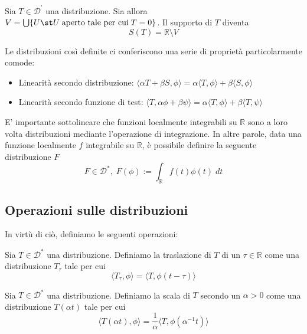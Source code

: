         \begin{definition}
            Sia $T \in \mathcal{D}^{'}$ una distribuzione.
            Sia allora $V = \bigcup \{U \st U \; \textnormal{aperto tale per cui} \; T = 0\}$.
            Il supporto di $T$ diventa
            \[
                S(T) = \mathbb{R} \setminus V
            \]
        \end{definition}

        Le distribuzioni così definite ci conferiscono una serie di proprietà particolarmente comode:

        \begin{itemize}
            \item Linearità secondo distribuzione: $\langle \alpha T + \beta S, \phi\rangle = \alpha \langle T, \phi \rangle + \beta \langle S, \phi \rangle$
            \item Linearità secondo funzione di test: $\langle T, \alpha \phi + \beta \psi \rangle = \alpha \langle T, \phi \rangle + \beta \langle T, \psi \rangle$
        \end{itemize}

        E' importante sottolineare che funzioni localmente integrabili su $\mathbb{R}$ sono a loro volta distribuzioni mediante l'operazione di integrazione.
        In altre parole, data una funzione localmente $f$ integrabile su $\mathbb{R}$, è possibile definire la seguente distribuzione $F$
        \[
            F \in \mathcal{D}^{*}, \; F(\phi) := \int_{\mathbb{R}} f(t) \phi(t) \; dt
        \]

    \subsection{Operazioni sulle distribuzioni}
        In virtù di ciò, definiamo le seguenti operazioni:

        \begin{definition}
            Sia $T \in \mathcal{D}^{*}$ una distribuzione.
            Definiamo la traslazione di $T$ di un $\tau \in \mathbb{R}$ come una distribuzione $T_{\tau}$ tale per cui
            \[
                \langle T_{\tau}, \phi \rangle = \langle T, \phi(t - \tau) \rangle
            \]
        \end{definition}

        \begin{definition}
            Sia $T \in \mathcal{D}^{*}$ una distribuzione.
            Definiamo la scala di $T$ secondo un $\alpha > 0$ come una distribuzione $T(\alpha t)$ tale per cui
            \[
                \langle T(\alpha t), \phi \rangle = \frac{1}{\alpha} \langle T, \phi(\alpha^{-1} t)\rangle
            \]
        \end{definition}

